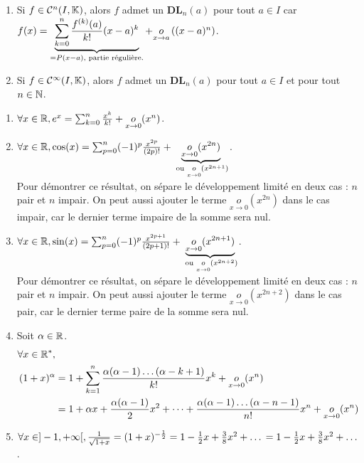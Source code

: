 \documentclass[12pt, a4paper]{report}
\begin{document}
\begin{consequence}
    \begin{enumerate}
        \item Si $f \in \mathcal{C}^n(I,\mathbb{K})$, alors $f$ admet un $\mathbf{DL}_n(a)$ pour tout $a \in I$ car $f(x) = \underbrace{\sum_{k=0}^{n} \frac{f^{(k)}(a)}{k!}(x-a)^k}_{=P(x-a),\text{ partie régulière.}} + \underset{x\to a}{o}\left((x-a)^n\right)$.
        \item Si $f \in \mathcal{C}^\infty(I,\mathbb{K})$, alors $f$ admet un $\mathbf{DL}_n(a)$ pour tout $a \in I$ et pour tout $n \in \mathbb{N}$.
    \end{enumerate}
\end{consequence}

\begin{example}
    \begin{enumerate}
        \item $\forall x \in \mathbb{R}, e^x = \sum_{k=0}^{n} \frac{x^k}{k!} + \underset{x\to 0}{o}(x^n)$.
        \item $\forall x \in \mathbb{R}, \cos(x) = \sum_{p=0}^{n} (-1)^p \frac{x^{2p}}{(2p)!} + \underbrace{\underset{x\to 0}{o}(x^{2n})}_{\text{ ou } \underset{x\to 0}{o}(x^{2n+1})}$.\\Pour démontrer ce résultat, on sépare le développement limité en deux cas : $n$ pair et $n$ impair. On peut aussi ajouter le terme $\underset{x\to 0}{o}(x^{2n})$ dans le cas impair, car le dernier terme impaire de la somme sera nul.
        \item $\forall x \in \mathbb{R}, \sin(x) = \sum_{p=0}^{n} (-1)^p \frac{x^{2p+1}}{(2p+1)!} + \underbrace{\underset{x\to 0}{o}(x^{2n+1})}_{\text{ ou } \underset{x\to 0}{o}(x^{2n+2})}$.\\Pour démontrer ce résultat, on sépare le développement limité en deux cas : $n$ pair et $n$ impair. On peut aussi ajouter le terme $\underset{x\to 0}{o}(x^{2n+2})$ dans le cas pair, car le dernier terme paire de la somme sera nul.
        \item Soit $\alpha \in \mathbb{R}$.
        \begin{align*}
            \forall x \in \mathbb{R}^*,\\(1+x)^\alpha &= 1 + \sum_{k=1}^n \frac{\alpha(\alpha-1)\dots(\alpha - k + 1)}{k!} x^k + \underset{x\to 0}{o}(x^n)\\
            &= 1 + \alpha x + \frac{\alpha(\alpha-1)}{2} x^2 + \dots + \frac{\alpha(\alpha-1)\dots(\alpha - n - 1)}{n!} x^n + \underset{x\to 0}{o}(x^n)
        \end{align*}
        \item $\forall x \in ]-1,+\infty[, \frac{1}{\sqrt{1+x}}=(1+x)^{-\frac{1}{2}} = 1 - \frac{1}{2}x + \frac{3}{8}x^2 + \dots \\= 1 - \frac12 x + \frac38 x^2 + \dots$.

\end{enumerate}
\end{example}
\end{document}
